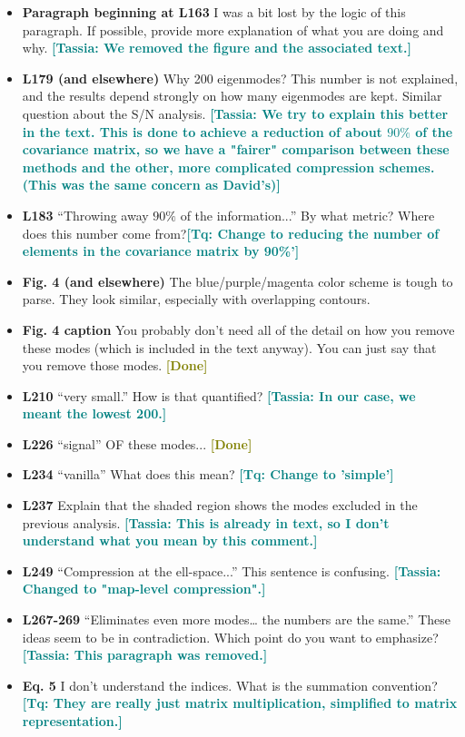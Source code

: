 \documentclass{article}
\newcommand\tassia[1]{{\bf {\textcolor{teal}{[Tassia: #1]}}}}
\newcommand\tq[1]{{\bf {\textcolor{teal}{[Tq: #1]}}}}
\newcommand\done{{\bf {\textcolor{olive}{[Done]}}}}
\begin{document}
\begin{itemize}
	\item \textbf{Paragraph beginning at L163} I was a bit lost by the logic of this paragraph. If possible, provide more explanation of what you are doing and why. \tassia{We removed the figure and the associated text.}
	\item \textbf{L179 (and elsewhere)} Why 200 eigenmodes? This number is not explained, and the results depend strongly on how many eigenmodes are kept. Similar question about the S/N analysis. \tassia{We try to explain this better in the text. This is done to achieve a reduction of about $90\%$ of the covariance matrix, so we have a "fairer" comparison between these methods and the other, more complicated compression schemes. (This was the same concern as David's)}
	\item \textbf{L183} “Throwing away $90\%$ of the information...” By what metric? Where does this number come from?\tq{Change to reducing the number of elements in the covariance matrix by 90\%'}
	\item \textbf{Fig. 4 (and elsewhere)} The blue/purple/magenta color scheme is tough to parse. They look similar, especially with overlapping contours.
	\item \textbf{Fig. 4 caption} You probably don’t need all of the detail on how you remove these modes (which is included in the text anyway). You can just say that you remove those modes. \done
	\item \textbf{L210} “very small.” How is that quantified? \tassia{In our case, we meant the lowest 200.}
	\item \textbf{L226} “signal” OF these modes... \done
	\item \textbf{L234} “vanilla” What does this mean? \tq{Change to 'simple'}
	\item \textbf{L237} Explain that the shaded region shows the modes excluded in the previous analysis. \tassia{This is already in text, so I don't understand what you mean by this comment.}
	\item \textbf{L249} “Compression at the ell-space...” This sentence is confusing. \tassia{Changed to "map-level compression".}
	\item \textbf{L267-269} “Eliminates even more modes… the numbers are the same.” These ideas seem to be in contradiction. Which point do you want to emphasize? \tassia{This paragraph was removed.}
	\item \textbf{Eq. 5} I don’t understand the indices. What is the summation convention? \tq{They are really just matrix multiplication, simplified to matrix representation.}

\end{itemize}
\end{document}
